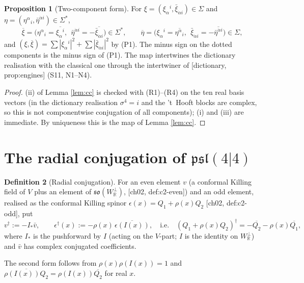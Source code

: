 \documentclass[11pt]{article}
\theoremstyle{definition}
\newtheorem{definition}{Definition}[section]
\newtheorem{proposition}[definition]{Proposition}
\begin{document}
\begin{proposition}[Two-component form]
\label{prop:cc2}
For $\xi=(\xi_\alpha{}^i,\bar\xi_{\dot\alpha i})\in\Sigma$ and $\eta=(\eta^\alpha{}_i,\bar\eta^{\dot\alpha i})\in\Sigma^*$,
\[
\overline\xi=\big(\eta^\alpha{}_i=\overline{\xi_\alpha{}^i},\ \ \bar\eta^{\dot\alpha i}=-\overline{\bar\xi_{\dot\alpha i}}\big)\in\Sigma^*,\qquad
\overline\eta=\big(\xi_\alpha{}^i=\overline{\eta^\alpha{}_i},\ \ \bar\xi_{\dot\alpha i}=-\overline{\bar\eta^{\dot\alpha i}}\big)\in\Sigma,
\]
and $(\xi,\overline\xi)=\sum|\xi_\alpha{}^i|^2+\sum|\bar\xi_{\dot\alpha i}|^2$ by (P1). The minus sign on the dotted components is the minus sign of (P1). The map intertwines the dictionary realisation with the classical one through the intertwiner of [dictionary, prop:engines] (S11, N1--N4).
\end{proposition}

\begin{proof}
(ii) of Lemma \ref{lem:cc} is checked with (R1)--(R4) on the ten real basis vectors (in the dictionary realisation $\sigma^4=i$ and the 't~Hooft blocks are complex, so this is not componentwise conjugation of all components); (i) and (iii) are immediate. By uniqueness this is the map of Lemma \ref{lem:cc}.
\end{proof}

\section{The radial conjugation of $\mathfrak{psl}(4|4)$}

\begin{definition}[Radial conjugation]
\label{def:dag}
For an even element $v$ (a conformal Killing field of $V$ plus an element of $\mathfrak{so}(W_{\mathbb R}^\perp)$, [ch02, def:c2-even]) and an odd element, realised as the conformal Killing spinor $\epsilon(x)=Q_1+\rho(x)Q_2$ [ch02, def:c2-odd], put
\[
v^\dagger:=-I_*\bar v,\qquad \epsilon^\dagger(x):=-\rho(x)\,\overline{\epsilon(I(x))},\quad\text{i.e.}\quad (Q_1+\rho(x)Q_2)^\dagger=-\overline{Q_2}-\rho(x)\overline{Q_1},
\]
where $I_*$ is the pushforward by $I$ (acting on the $V$-part; $I$ is the identity on $W^\perp_{\mathbb R}$) and $\bar v$ has complex conjugated coefficients.
\end{definition}

The second form follows from $\rho(x)\rho(I(x))=1$ and $\overline{\rho(I(x))Q_2}=\rho(I(x))\overline{Q_2}$ for real $x$.
\end{document}
